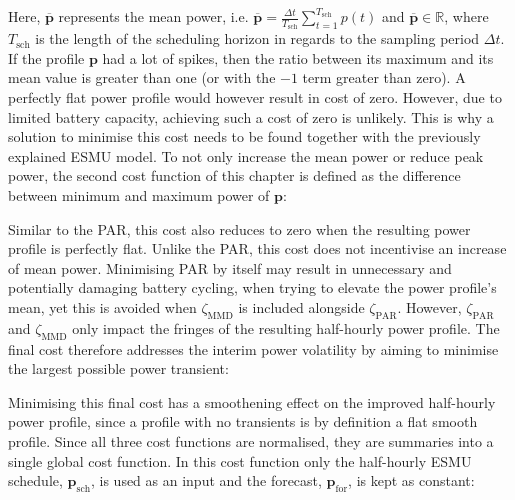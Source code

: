 Here, $\overline{\textbf{p}}$ represents the mean power, i.e. $\overline{\textbf{p}} = \frac{\Delta t}{T_\text{sch}}\sum_{t=1}^{T_\text{sch}}p(t)$ and $\overline{\textbf{p}} \in \mathbb{R}$, where $T_\text{sch}$ is the length of the scheduling horizon in regards to the sampling period $\Delta t$.
If the profile $\textbf{p}$ had a lot of spikes, then the ratio between its maximum and its mean value is greater than one (or with the $-1$ term greater than zero).
A perfectly flat power profile would however result in cost of zero.
However, due to limited battery capacity, achieving such a cost of zero is unlikely.
This is why a solution to minimise this cost needs to be found together with the previously explained ESMU model.
To not only increase the mean power or reduce peak power, the second cost function of this chapter is defined as the difference between minimum and maximum power of $\textbf{p}$:




Similar to the PAR, this cost also reduces to zero when the resulting power profile is perfectly flat.
Unlike the PAR, this cost does not incentivise an increase of mean power.
Minimising PAR by itself may result in unnecessary and potentially damaging battery cycling, when trying to elevate the power profile's mean, yet this is avoided when $\zeta_\text{MMD}$ is included alongside $\zeta_\text{PAR}$.
However, $\zeta_\text{PAR}$ and $\zeta_\text{MMD}$ only impact the fringes of the resulting half-hourly power profile.
The final cost therefore addresses the interim power volatility by aiming to minimise the largest possible power transient:




Minimising this final cost has a smoothening effect on the improved half-hourly power profile, since a profile with no transients is by definition a flat smooth profile.
Since all three cost functions are normalised, they are summaries into a single global cost function.
In this cost function only the half-hourly ESMU schedule, $\textbf{p}_\text{sch}$, is used as an input and the forecast, $\textbf{p}_\text{for}$, is kept as constant:

